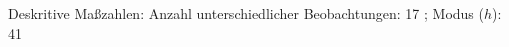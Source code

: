 				\label{tableValues:astu023c_g2d}
				\vspace*{-\baselineskip}
                    \begin{noten}
                	    \note{} Deskritive Maßzahlen:
                	    Anzahl unterschiedlicher Beobachtungen: 17%
                	    ; 
                	      Modus ($h$): 41
                     \end{noten}


